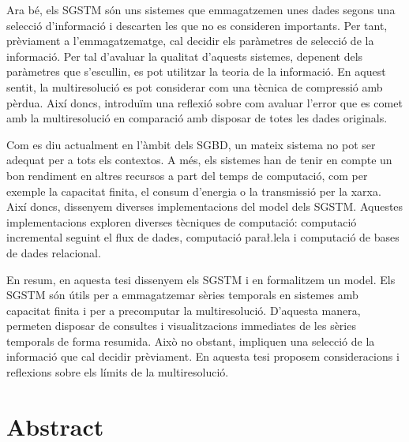 Ara bé, els \gls{SGSTM} són uns sistemes que emmagatzemen unes dades
segons una selecció d'informació i descarten les que no es consideren
importants. Per tant, prèviament a l'emmagatzematge, cal decidir els
paràmetres de selecció de la informació. Per tal d'avaluar la qualitat
d'aquests sistemes, depenent dels paràmetres que s'escullin, es pot
utilitzar la teoria de la informació. En aquest sentit, la
multiresolució es pot considerar com una tècnica de compressió amb
pèrdua. Així doncs, introduïm una reflexió sobre com avaluar l'error
que es comet amb la multiresolució en comparació amb disposar de totes
les dades originals.


Com es diu actualment en l'àmbit dels \gls{SGBD}, un mateix sistema no
pot ser adequat per a tots els contextos. A més, els sistemes han de
tenir en compte un bon rendiment en altres recursos a part del temps
de computació, com per exemple la capacitat finita, el consum
d'energia o la transmissió per la xarxa. Així doncs, dissenyem
diverses implementacions del model dels \gls{SGSTM}. Aquestes
implementacions exploren diverses tècniques de computació: computació
incremental seguint el flux de dades, computació para\l.lela i
computació de bases de dades relacional.


En resum, en aquesta tesi dissenyem els \gls{SGSTM} i en formalitzem
un model.  Els \gls{SGSTM} són útils per a emmagatzemar sèries
temporals en sistemes amb capacitat finita i per a precomputar la
multiresolució. D'aquesta manera, permeten disposar de consultes i
visualitzacions immediates de les sèries temporals de forma
resumida. Això no obstant, impliquen una selecció de la informació que
cal decidir prèviament. En aquesta tesi proposem consideracions i
reflexions sobre els límits de la multiresolució.





\chapter*{Abstract}









